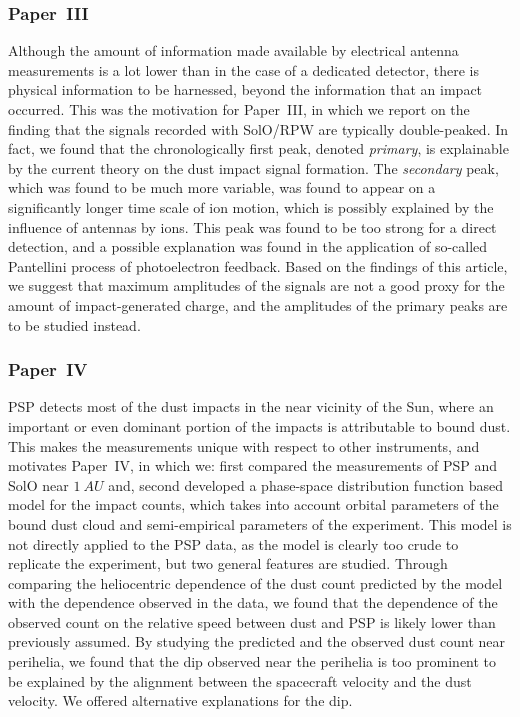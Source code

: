 \subsubsection{Paper~III}

Although the amount of information made available by electrical antenna measurements is a lot lower than in the case of a dedicated detector, there is physical information to be harnessed, beyond the information that an impact occurred. This was the motivation for Paper~III, in which we report on the finding that the signals recorded with SolO/RPW are typically double-peaked. In fact, we found that the chronologically first peak, denoted \textit{primary}, is explainable by the current theory on the dust impact signal formation. The \textit{secondary} peak, which was found to be much more variable, was found to appear on a significantly longer time scale of ion motion, which is possibly explained by the influence of antennas by ions. This peak was found to be too strong for a direct detection, and a possible explanation was found in the application of so-called Pantellini process of photoelectron feedback. Based on the findings of this article, we suggest that maximum amplitudes of the signals are not a good proxy for the amount of impact-generated charge, and the amplitudes of the primary peaks are to be studied instead.

\subsubsection{Paper~IV}

PSP detects most of the dust impacts in the near vicinity of the Sun, where an important or even dominant portion of the impacts is attributable to bound dust. This makes the measurements unique with respect to other instruments, and motivates Paper~IV, in which we: first compared the measurements of PSP and SolO near $\SI{1}{AU}$ and, second developed a phase-space distribution function based model for the impact counts, which takes into account orbital parameters of the bound dust cloud and semi-empirical parameters of the experiment. This model is not directly applied to the PSP data, as the model is clearly too crude to replicate the experiment, but two general features are studied. Through comparing the heliocentric dependence of the dust count predicted by the model with the dependence observed in the data, we found that the dependence of the observed count on the relative speed between dust and PSP is likely lower than previously assumed. By studying the predicted and the observed dust count near perihelia, we found that the dip observed near the perihelia is too prominent to be explained by the alignment between the spacecraft velocity and the dust velocity. We offered alternative explanations for the dip. 